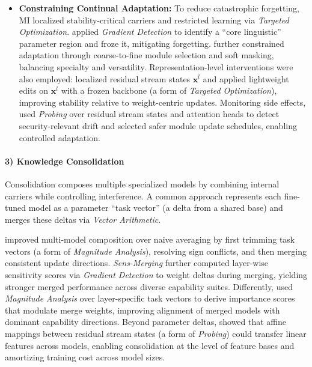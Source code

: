 \documentclass[11pt,letterpaper]{mystyle}
\begin{document}
\begin{itemize}[leftmargin=*]
      \item \textbf{Constraining Continual Adaptation:}
      To reduce catastrophic forgetting, MI localized stability-critical carriers and restricted learning via \textit{Targeted Optimization}. 
      \citet{zhang2024linguistic} applied \textit{Gradient Detection} to identify a ``core linguistic'' parameter region and froze it, mitigating forgetting. 
      \citet{zhang2024cofitune} further constrained adaptation through coarse-to-fine module selection and soft masking, balancing specialty and versatility. 
      Representation-level interventions were also employed: \citet{wu2024reft} localized residual stream states $\mathbf{x}^l$ and applied lightweight edits on $\mathbf{x}^l$ with a frozen backbone (a form of \textit{Targeted Optimization}), improving stability relative to weight-centric updates. 
      Monitoring side effects, \citet{du2024tst} used \textit{Probing} over residual stream states and attention heads to detect security-relevant drift and selected safer module update schedules, enabling controlled adaptation.
  \end{itemize}
  
  \paragraph{3) Knowledge Consolidation}
  Consolidation composes multiple specialized models by combining internal carriers while controlling interference. A common approach represents each fine-tuned model as a parameter ``task vector'' (a delta from a shared base) and merges these deltas via \textit{Vector Arithmetic}.
  
  \citet{yadav2023tiesmerging} improved multi-model composition over naive averaging by first trimming task vectors (a form of \textit{Magnitude Analysis}), resolving sign conflicts, and then merging consistent update directions.
  \textit{Sens-Merging} \citep{liu2025sensmerging} further computed layer-wise sensitivity scores via \textit{Gradient Detection} to weight deltas during merging, yielding stronger merged performance across diverse capability suites. Differently, \citet{yao2025activation} used \textit{Magnitude Analysis} over layer-specific task vectors to derive importance scores that modulate merge weights, improving alignment of merged models with dominant capability directions.
  Beyond parameter deltas, \citet{chen2025stitching} showed that affine mappings between residual stream states (a form of \textit{Probing}) could transfer linear features across models, enabling consolidation at the level of feature bases and amortizing training cost across model sizes.
  
\end{document}
